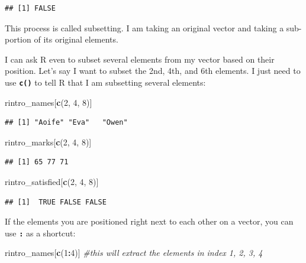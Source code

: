 \documentclass[
]{book}
\newenvironment{Shaded}{\begin{snugshade}}{\end{snugshade}}
\newcommand{\CommentTok}[1]{\textcolor[rgb]{0.56,0.35,0.01}{\textit{#1}}}
\newcommand{\DecValTok}[1]{\textcolor[rgb]{0.00,0.00,0.81}{#1}}
\newcommand{\FunctionTok}[1]{\textcolor[rgb]{0.13,0.29,0.53}{\textbf{#1}}}
\newcommand{\NormalTok}[1]{#1}
\newcommand{\SpecialCharTok}[1]{\textcolor[rgb]{0.81,0.36,0.00}{\textbf{#1}}}
\begin{document}
\begin{verbatim}
## [1] FALSE
\end{verbatim}

This process is called subsetting. I am taking an original vector and taking a sub-portion of its original elements.

I can ask R even to subset several elements from my vector based on their position. Let's say I want to subset the 2nd, 4th, and 6th elements. I just need to use \textbf{\texttt{c()}} to tell R that I am subsetting several elements:

\begin{Shaded}
\begin{Highlighting}[]
\NormalTok{rintro\_names[}\FunctionTok{c}\NormalTok{(}\DecValTok{2}\NormalTok{, }\DecValTok{4}\NormalTok{, }\DecValTok{8}\NormalTok{)]}
\end{Highlighting}
\end{Shaded}

\begin{verbatim}
## [1] "Aoife" "Eva"   "Owen"
\end{verbatim}

\begin{Shaded}
\begin{Highlighting}[]
\NormalTok{rintro\_marks[}\FunctionTok{c}\NormalTok{(}\DecValTok{2}\NormalTok{, }\DecValTok{4}\NormalTok{, }\DecValTok{8}\NormalTok{)]}
\end{Highlighting}
\end{Shaded}

\begin{verbatim}
## [1] 65 77 71
\end{verbatim}

\begin{Shaded}
\begin{Highlighting}[]
\NormalTok{rintro\_satisfied[}\FunctionTok{c}\NormalTok{(}\DecValTok{2}\NormalTok{, }\DecValTok{4}\NormalTok{, }\DecValTok{8}\NormalTok{)]}
\end{Highlighting}
\end{Shaded}

\begin{verbatim}
## [1]  TRUE FALSE FALSE
\end{verbatim}

If the elements you are positioned right next to each other on a vector, you can use \textbf{\texttt{:}} as a shortcut:

\begin{Shaded}
\begin{Highlighting}[]
\NormalTok{rintro\_names[}\FunctionTok{c}\NormalTok{(}\DecValTok{1}\SpecialCharTok{:}\DecValTok{4}\NormalTok{)] }\CommentTok{\#this will extract the elements in index 1, 2, 3, 4}
\end{Highlighting}
\end{Shaded}
\end{document}

